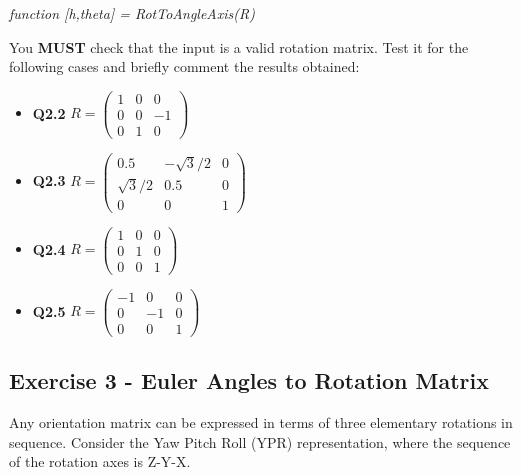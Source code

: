\begin{center}\textit{function [h,theta] = RotToAngleAxis(R)}\end{center}


You \textbf{MUST} check that the input is a valid rotation matrix. Test it for the following cases and briefly comment the results obtained:

\begin{itemize}
    \item \textbf{Q2.2}\hspace{10mm} $R = \begin{pmatrix}
        1 & 0 & 0 \\
        0 & 0 & -1 \\
        0 & 1 & 0
    \end{pmatrix}$
    
    \item \textbf{Q2.3}\hspace{10mm} $R = \begin{pmatrix}
        0.5& -\sqrt{3}/2 & 0 \\
        \sqrt{3}/2 & 0.5 & 0 \\
        0 & 0 & 1
    \end{pmatrix}$
    
    \item \textbf{Q2.4}\hspace{10mm} $R = \begin{pmatrix}
        1 & 0 & 0 \\
        0 & 1 & 0 \\
        0 & 0 & 1
    \end{pmatrix}$
    
    \item \textbf{Q2.5}\hspace{10mm} $R = \begin{pmatrix}
        -1 & 0 & 0 \\
        0 & -1 & 0 \\
        0 & 0 & 1
    \end{pmatrix}$
\end{itemize}

\subsection{Exercise 3 - Euler Angles to Rotation Matrix}
Any orientation matrix can be expressed in terms of three elementary rotations in sequence. Consider the Yaw Pitch Roll (YPR) representation, where the sequence of the rotation axes is Z-Y-X.
\newline

